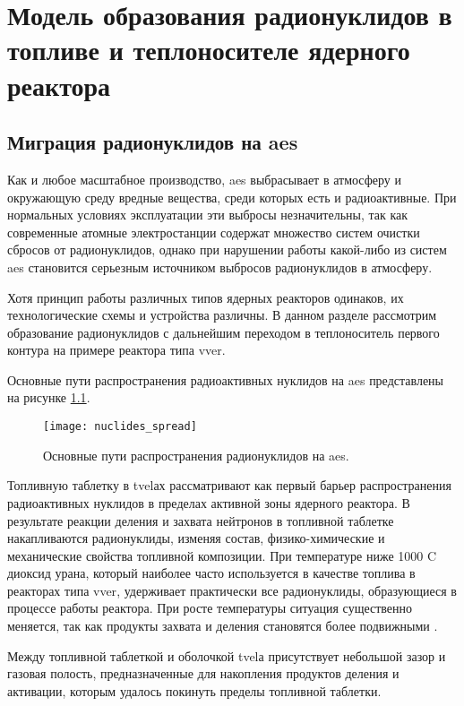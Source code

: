 \chapter{Модель образования радионуклидов в топливе и теплоносителе ядерного реактора}

\section{Миграция радионуклидов на \ac{aes}}

Как и любое масштабное производство, \ac{aes} выбрасывает в атмосферу и окружающую среду вредные вещества, среди 
которых есть и радиоактивные. При нормальных условиях эксплуатации эти выбросы незначительны, так как современные 
атомные электростанции содержат множество систем очистки сбросов от радионуклидов, однако при нарушении работы 
какой-либо из систем \ac{aes} становится серьезным источником выбросов радионуклидов в атмосферу. 

Хотя принцип работы различных типов ядерных реакторов одинаков, их технологические схемы и устройства различны. В 
данном разделе рассмотрим образование радионуклидов с дальнейшим переходом в теплоноситель первого контура на примере 
реактора типа \ac{vver}.

Основные пути распространения радиоактивных нуклидов на \ac{aes} представлены на рисунке \ref{fig_nuclides_spread}.

\begin{figure}[ht]
\centering
	\texttt{[image: nuclides\_spread]}
    \caption{Основные пути распространения радионуклидов на \ac{aes}.}
    \label{fig_nuclides_spread}
\end{figure}

Топливную таблетку в \ac{tvel}ах рассматривают как первый барьер распространения радиоактивных нуклидов в пределах 
активной зоны ядерного реактора. В результате реакции деления и захвата нейтронов в топливной таблетке накапливаются 
радионуклиды, изменяя состав, физико-химические и механические свойства топливной композиции. При температуре ниже 
1000 \degree C диоксид урана, который наиболее часто используется в качестве топлива в реакторах типа \ac{vver}, 
удерживает практически все радионуклиды, образующиеся в процессе работы реактора. При росте температуры ситуация 
существенно меняется, так как продукты захвата и деления становятся более подвижными \cite{leskin_vver}.

Между топливной таблеткой и оболочкой \ac{tvel}а присутствует небольшой зазор и газовая полость, предназначенные для 
накопления продуктов деления и активации, которым удалось покинуть пределы топливной таблетки.

